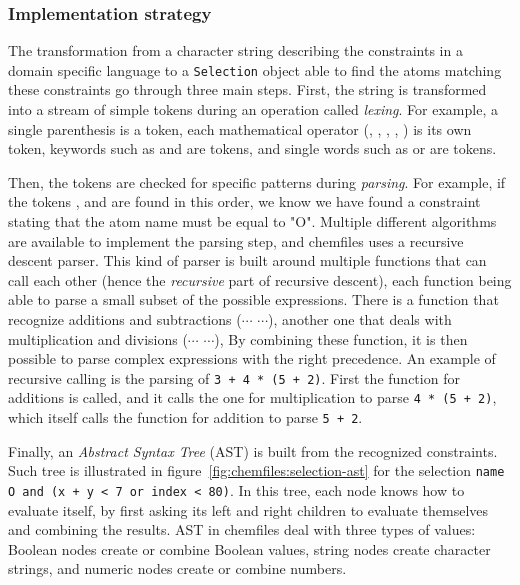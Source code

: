 \documentclass[thesis]{subfiles}
\begin{document}
\subsubsection{Implementation strategy}

The transformation from a character string describing the constraints in a
domain specific language to a \texttt{Selection} object able to find the atoms
matching these constraints go through three main steps. First, the string is
transformed into a stream of simple tokens during an operation called
\emph{lexing}. For example, a single parenthesis \token{(} is a token, each
mathematical operator (\token{+}, \token{-}, \token{*}, \token{/},
\token{\textasciicircum}) is its own token, keywords such as  and
 are tokens, and single words such as  or 
are tokens.

Then, the tokens are checked for specific patterns during \emph{parsing}. For
example, if the tokens , \token{==} and  are found in
this order, we know we have found a constraint stating that the atom name must be
equal to "O". Multiple different algorithms are available to implement the
parsing step, and chemfiles uses a recursive descent parser. This kind of parser
is built around multiple functions that can call each other (hence the
\emph{recursive} part of recursive descent), each function being able to parse a
small subset of the possible expressions. There is a function that recognize
additions and subtractions ($\cdots$ \token{+|-} $\cdots$), another one that
deals with multiplication and divisions ($\cdots$ \token{*|/} $\cdots$), \etc By
combining these function, it is then possible to parse complex expressions with
the right precedence. An example of recursive calling is the parsing of
\texttt{3 + 4 * (5 + 2)}. First the function for additions is called, and it
calls the one for multiplication to parse \texttt{4 * (5 + 2)}, which itself
calls the function for addition to parse \texttt{5 + 2}.

Finally, an \emph{Abstract Syntax Tree} (AST) is built from the recognized
constraints. Such tree is illustrated in figure~\ref{fig:chemfiles:selection-ast}
for the selection \texttt{name O and (x + y < 7 or index < 80)}. In this tree,
each node knows how to evaluate itself, by first asking its left and right
children to evaluate themselves and combining the results. AST in chemfiles deal
with three types of values: Boolean nodes create or combine Boolean values,
string nodes create character strings, and numeric nodes create or combine
numbers.
\end{document}
